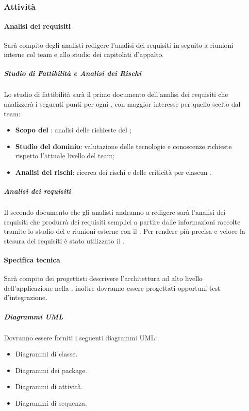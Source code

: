 \subsubsection{Attività}
\label{sec:2.1.1}
		\paragraph{Analisi dei requisiti}
		\label{sec:2.1.1.1}
			Sarà compito degli analisti redigere l'analisi dei requisiti in seguito a riunioni interne col team e allo studio dei capitolati d'appalto.
			\subparagraph{Studio di Fattibilità e Analisi dei Rischi}
			\label{sec:2.1.1.1.1}
				Lo studio di fattibilità sarà il primo documento dell'analisi dei requisiti che analizzerà i seguenti punti per ogni , con maggior interesse per quello scelto dal team:
				\begin{itemize}
					\item \textbf{Scopo del }: analisi delle richieste del ;
					\item \textbf{Studio del dominio}: valutazione delle tecnologie e conoscenze richieste rispetto l'attuale livello del team;
					\item \textbf{Analisi dei rischi}: ricerca dei rischi e delle criticità per ciascun .
				\end{itemize}
			\subparagraph{Analisi dei requisiti}
			\label{sec:2.1.1.1.2}
				Il secondo documento che gli analisti andranno a redigere sarà l'analisi dei requisiti che produrrà dei requisiti semplici a partire dalle informazioni raccolte tramite lo studio del  e riunioni esterne con il .
				Per rendere più precisa e veloce la stesura dei requisiti è stato utilizzato il  .
		\paragraph{Specifica tecnica}
		\label{sec:2.1.1.2}
			Sarà compito dei progettisti descrivere l'architettura ad alto livello dell'applicazione nella \STdoc, inoltre dovranno essere progettati  opportuni test d'integrazione.
			
			\subparagraph{Diagrammi UML}
			\label{sec:2.1.1.2.1}
				Dovranno essere forniti i seguenti diagrammi UML:
				\begin{itemize}
					\item Diagrammi di classe.
					\item Diagrammi dei package.
					\item Diagrammi di attività.
					\item Diagrammi di sequenza.
				\end{itemize}
				
